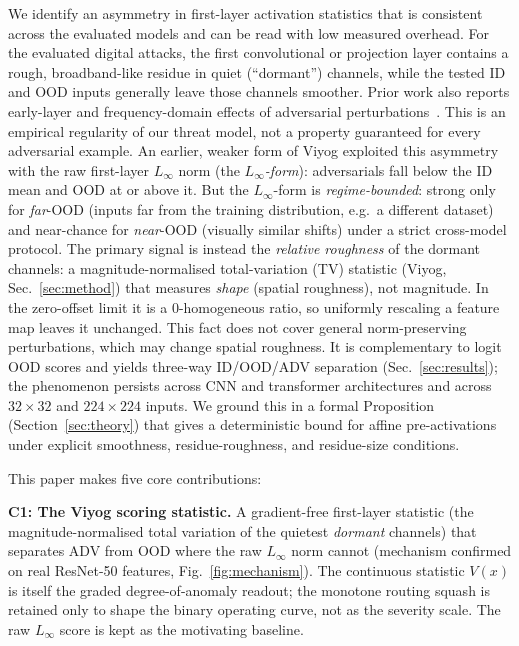 \documentclass[10pt,letterpaper,journal]{IEEEtran}
\newcommand{\rev}[1]{#1}
\begin{document}
We identify an asymmetry in first-layer activation statistics that is consistent
across the evaluated models and can be read with low measured overhead.
For the evaluated digital attacks, the first convolutional or projection layer
contains a rough, broadband-like residue in quiet (``dormant'') channels, while
the tested ID and OOD inputs generally leave those channels smoother. Prior
work also reports early-layer and frequency-domain effects of adversarial
perturbations~\cite{FLOD,bakiskan2022early}. This is an empirical regularity of
our threat model, not a property guaranteed for every adversarial example.
\rev{An earlier, weaker form of Viyog exploited this asymmetry with the raw
first-layer $L_\infty$ norm (the \emph{$L_\infty$-form}): adversarials fall below
the ID mean and OOD at or above it. But the $L_\infty$-form is
\emph{regime-bounded}: strong only for \emph{far}-OOD (inputs far from the
training distribution, e.g.\ a different dataset) and near-chance for
\emph{near}-OOD (visually similar shifts) under a strict cross-model protocol.}
The primary signal is instead the \emph{relative roughness} of the dormant
channels: a magnitude-normalised total-variation (TV) statistic (Viyog,
Sec.~\ref{sec:method}) that measures \emph{shape} (spatial roughness), not
magnitude. \rev{In the zero-offset limit it is a $0$-homogeneous ratio, so
uniformly rescaling a feature map leaves it unchanged. This fact does not cover
general norm-preserving perturbations, which may change spatial roughness.} It is
complementary to logit OOD scores and yields three-way ID/OOD/ADV separation
(Sec.~\ref{sec:results}); the phenomenon persists across CNN and transformer
architectures and across $32\times32$ and $224\times224$ inputs. We ground this
in a formal Proposition (Section~\ref{sec:theory}) that gives a deterministic
bound for affine pre-activations under explicit smoothness, residue-roughness,
and residue-size conditions.

This paper makes five core contributions:

\noindent\textbf{C1: The Viyog scoring statistic.} A gradient-free
first-layer statistic (the magnitude-normalised total variation of the quietest
\emph{dormant} channels) that separates ADV from OOD where the raw $L_\infty$
norm cannot (mechanism confirmed on real ResNet-50 features, Fig.~\ref{fig:mechanism}). The continuous statistic $V(x)$ is itself the graded
degree-of-anomaly readout; the monotone routing squash is retained only to shape the binary operating curve, not as the severity scale. The raw
$L_\infty$ score is kept as the motivating baseline.
\end{document}
